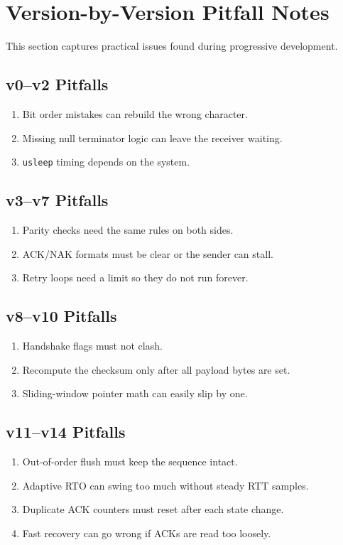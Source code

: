 \section{Version-by-Version Pitfall Notes}
This section captures practical issues found during progressive development.

\subsection{v0--v2 Pitfalls}
\begin{enumerate}
    \item Bit order mistakes can rebuild the wrong character.
    \item Missing null terminator logic can leave the receiver waiting.
    \item \texttt{usleep} timing depends on the system.
\end{enumerate}

\subsection{v3--v7 Pitfalls}
\begin{enumerate}
    \item Parity checks need the same rules on both sides.
    \item ACK/NAK formats must be clear or the sender can stall.
    \item Retry loops need a limit so they do not run forever.
\end{enumerate}

\subsection{v8--v10 Pitfalls}
\begin{enumerate}
    \item Handshake flags must not clash.
    \item Recompute the checksum only after all payload bytes are set.
    \item Sliding-window pointer math can easily slip by one.
\end{enumerate}

\subsection{v11--v14 Pitfalls}
\begin{enumerate}
    \item Out-of-order flush must keep the sequence intact.
    \item Adaptive RTO can swing too much without steady RTT samples.
    \item Duplicate ACK counters must reset after each state change.
    \item Fast recovery can go wrong if ACKs are read too loosely.
\end{enumerate}

